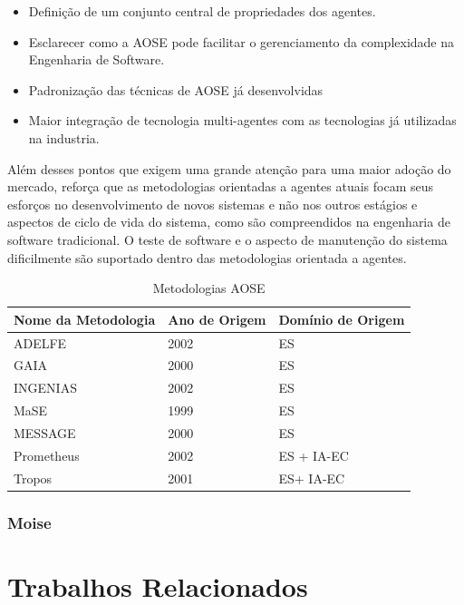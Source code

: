 \documentclass[dm,ppgcomp]{texfurg} %
\begin{document}
\begin{itemize}
\item Definição de um conjunto central de propriedades dos agentes.
\item Esclarecer como a AOSE pode facilitar o gerenciamento da complexidade na Engenharia de Software.
\item Padronização das técnicas de AOSE já desenvolvidas
\item Maior integração de tecnologia multi-agentes com as tecnologias já utilizadas na industria.
\end{itemize}

Além desses pontos que exigem uma grande atenção para uma maior adoção do mercado, \citet{sturm2014landscape} reforça que as metodologias orientadas a agentes atuais focam seus esforços no desenvolvimento de novos sistemas e não nos outros estágios e aspectos de ciclo de vida do sistema, como são compreendidos na engenharia de software tradicional. O teste de software e o aspecto de manutenção do sistema dificilmente são suportado dentro das metodologias orientada a agentes.

\begin{table}[h]
\centering
\caption{Metodologias AOSE}
\label{tab:metodologias}
\begin{tabular}{@{}lll@{}}
\toprule
Nome da Metodologia & Ano de Origem & Domínio de Origem \\ \midrule
ADELFE              & 2002          & ES                \\ 
GAIA                & 2000          & ES                \\ 
INGENIAS            & 2002          & ES                \\ 
MaSE                & 1999          & ES                \\ 
MESSAGE             & 2000          & ES                \\ 
Prometheus          & 2002          & ES + IA-EC        \\ 
Tropos              & 2001          & ES+ IA-EC         \\ \bottomrule
\end{tabular}
\end{table}
  
\subsubsection{Moise}

\section{Trabalhos Relacionados}
\end{document}
